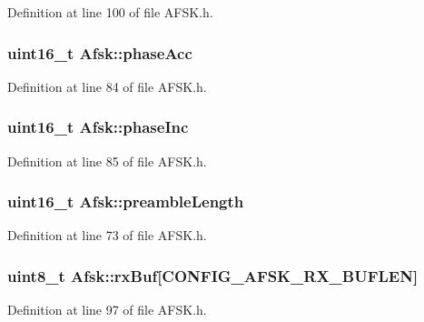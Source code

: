 Definition at line 100 of file A\+F\+S\+K.\+h.

\subsubsection[{\texorpdfstring{phase\+Acc}{phaseAcc}}]{\setlength{\rightskip}{0pt plus 5cm}uint16\+\_\+t Afsk\+::phase\+Acc}\hypertarget{struct_afsk_aa62658bb66ca18cf3d268258ef126283}{}\label{struct_afsk_aa62658bb66ca18cf3d268258ef126283}


Definition at line 84 of file A\+F\+S\+K.\+h.

\subsubsection[{\texorpdfstring{phase\+Inc}{phaseInc}}]{\setlength{\rightskip}{0pt plus 5cm}uint16\+\_\+t Afsk\+::phase\+Inc}\hypertarget{struct_afsk_ae5f800f21b5aa819af756c5572e63cce}{}\label{struct_afsk_ae5f800f21b5aa819af756c5572e63cce}


Definition at line 85 of file A\+F\+S\+K.\+h.

\subsubsection[{\texorpdfstring{preamble\+Length}{preambleLength}}]{\setlength{\rightskip}{0pt plus 5cm}uint16\+\_\+t Afsk\+::preamble\+Length}\hypertarget{struct_afsk_a586542863e66d99dbb7b655fa54af563}{}\label{struct_afsk_a586542863e66d99dbb7b655fa54af563}


Definition at line 73 of file A\+F\+S\+K.\+h.

\subsubsection[{\texorpdfstring{rx\+Buf}{rxBuf}}]{\setlength{\rightskip}{0pt plus 5cm}uint8\+\_\+t Afsk\+::rx\+Buf\mbox{[}{\bf C\+O\+N\+F\+I\+G\+\_\+\+A\+F\+S\+K\+\_\+\+R\+X\+\_\+\+B\+U\+F\+L\+EN}\mbox{]}}\hypertarget{struct_afsk_a8c7ee9d7b92796ccc7c3257b581695cb}{}\label{struct_afsk_a8c7ee9d7b92796ccc7c3257b581695cb}


Definition at line 97 of file A\+F\+S\+K.\+h.

